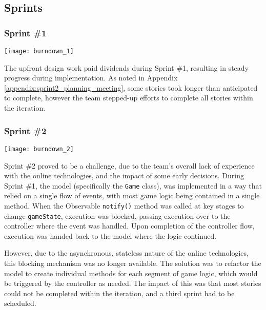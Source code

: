\subsection{Sprints}

\subsubsection{Sprint \#1}

\begin{center}
	\texttt{[image: burndown\_1]}
	\label{figure:burndown_1}
\end{center}

The upfront design work paid dividends during Sprint \#1, resulting in steady progress during implementation.
As noted in Appendix \ref{appendix:sprint2_planning_meeting}, some stories took longer than anticipated to complete, however the team stepped-up efforts to complete all stories within the iteration.

\subsubsection{Sprint \#2}

\begin{center}
	\texttt{[image: burndown\_2]}
	\label{figure:burndown_2}
\end{center}

Sprint \#2 proved to be a challenge, due to the team's overall lack of experience with the online technologies, and the impact of some early decisions.
During Sprint \#1, the model (specifically the \texttt{Game} class), was implemented in a way that relied on a single flow of events, with most game logic being contained in a single method. When the Observable \texttt{notify()} method was called at key stages to change \texttt{gameState}, execution was blocked, passing execution over to the controller where the event was handled. Upon completion of the controller flow, execution was handed back to the model where the logic continued.

However, due to the asynchronous, stateless nature of the online technologies, this blocking mechanism was no longer available.
The solution was to refactor the model to create individual methods for each segment of game logic, which would be triggered by the controller as needed.
The impact of this was that most stories could not be completed within the iteration, and a third sprint had to be scheduled.

